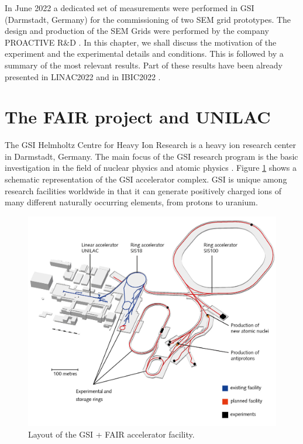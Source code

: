 \pagestyle{fancy}

\graphicspath{ {Figures/Chapter8_GSI/} }

In June 2022 a dedicated set of measurements were performed in GSI (Darmstadt, Germany) for the commissioning of two SEM grid prototypes. The design and production of the SEM Grids were performed by the company PROACTIVE R$\&$D \parencite[][]{ref:ProactiveRND}. In this chapter, we shall discuss the motivation of the experiment and the experimental details and conditions. This is followed by a summary of the most relevant results. Part of these results have been already presented in LINAC2022 \parencite[][]{ref:Linac2022Thomas} and in IBIC2022 \parencite[][]{ref:Ibic2022Juan}. 

\section{The FAIR project and UNILAC}
\label{sec:FAIR}

The GSI Helmholtz Centre for Heavy Ion Research is a heavy ion research center in Darmstadt, Germany. The main focus of the GSI research program is the basic investigation in the field of nuclear physics and atomic physics \parencite[][]{ref:GSI}. Figure \ref{fig:GSIlayout} shows a schematic representation of the GSI accelerator complex. GSI is unique among research facilities worldwide in that it can generate positively charged ions of many different naturally occurring elements, from protons to uranium. 

\begin{figure}[h]
    \centering
    \includegraphics[width=0.66\columnwidth]{GSIFacility/GSIFacility.jpg}
    \caption{Layout of the GSI + FAIR accelerator facility.}
    \label{fig:GSIlayout}
\end{figure}

